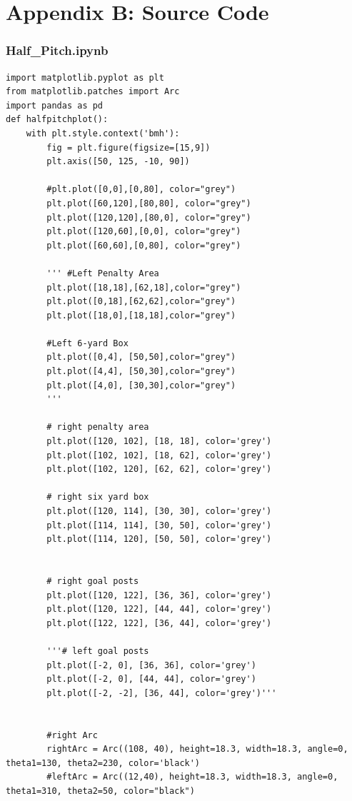 \chapter{Appendix B: Source Code}

\subsection{Half\_Pitch.ipynb}
\begin{lstlisting}[style=Python]
import matplotlib.pyplot as plt
from matplotlib.patches import Arc
import pandas as pd
def halfpitchplot():
    with plt.style.context('bmh'):
        fig = plt.figure(figsize=[15,9])
        plt.axis([50, 125, -10, 90])
        
        #plt.plot([0,0],[0,80], color="grey")
        plt.plot([60,120],[80,80], color="grey")
        plt.plot([120,120],[80,0], color="grey")
        plt.plot([120,60],[0,0], color="grey")
        plt.plot([60,60],[0,80], color="grey")

        ''' #Left Penalty Area
        plt.plot([18,18],[62,18],color="grey")
        plt.plot([0,18],[62,62],color="grey")
        plt.plot([18,0],[18,18],color="grey")

        #Left 6-yard Box
        plt.plot([0,4], [50,50],color="grey")
        plt.plot([4,4], [50,30],color="grey")
        plt.plot([4,0], [30,30],color="grey")
        '''
        
        # right penalty area
        plt.plot([120, 102], [18, 18], color='grey')
        plt.plot([102, 102], [18, 62], color='grey')
        plt.plot([102, 120], [62, 62], color='grey')

        # right six yard box
        plt.plot([120, 114], [30, 30], color='grey')
        plt.plot([114, 114], [30, 50], color='grey')
        plt.plot([114, 120], [50, 50], color='grey')


        # right goal posts
        plt.plot([120, 122], [36, 36], color='grey')
        plt.plot([120, 122], [44, 44], color='grey')
        plt.plot([122, 122], [36, 44], color='grey')

        '''# left goal posts
        plt.plot([-2, 0], [36, 36], color='grey')
        plt.plot([-2, 0], [44, 44], color='grey')
        plt.plot([-2, -2], [36, 44], color='grey')'''
        
        
        #right Arc
        rightArc = Arc((108, 40), height=18.3, width=18.3, angle=0, theta1=130, theta2=230, color='black')
        #leftArc = Arc((12,40), height=18.3, width=18.3, angle=0, theta1=310, theta2=50, color="black")
        

\end{lstlisting}
